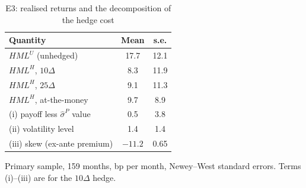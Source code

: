 \documentclass[11pt]{article}
\theoremstyle{result}
\newcommand{\HML}{\mathit{HML}}
\newcommand{\sigP}{\hat\sigma^{P}}
\newcommand{\D}{\Delta}
\begin{document}
\begin{table}[t]
\centering\small
\caption{E3: realised returns and the decomposition of the hedge cost}\label{tab:e3}
\begin{tabular}{lcc}
\toprule
Quantity & Mean & s.e. \\
\midrule
$\HML^U$ (unhedged) & 17.7 & 12.1 \\
$\HML^H$, $10\D$ & 8.3 & 11.9 \\
$\HML^H$, $25\D$ & 9.1 & 11.3 \\
$\HML^H$, at-the-money & 9.7 & 8.9 \\
\midrule
(i) payoff less $\sigP$ value & 0.5 & 3.8 \\
(ii) volatility level & 1.4 & 1.4 \\
(iii) skew (ex-ante premium) & $-11.2$ & 0.65 \\
\bottomrule
\end{tabular}
\par\medskip
\begin{minipage}{0.6\linewidth}\footnotesize
Primary sample, 159 months, bp per month, Newey--West standard errors. Terms (i)--(iii) are for the $10\D$ hedge.
\end{minipage}
\end{table}
\end{document}
